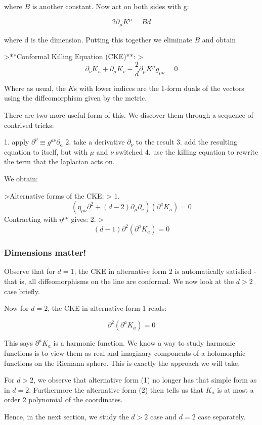 where $B$ is another constant. Now act on both sides with g:

$$2\partial_\mu K^\mu = B d$$

where d is the dimension. Putting this together we eliminate $B$ and obtain 


>**Conformal Killing Equation (CKE)**:
>$$\partial_\nu K_u + \partial_\mu K_v - \frac{2}{d}\partial_\mu K^\mu g_{\mu\nu} = 0$$

Where as usual, the $K$s with lower indices are the 1-form duals of the vectors using the diffeomorphism given by the metric.

There are two more useful form of this. We discover them through a sequence of contrived tricks:

1. apply $\partial^\nu \equiv g^{a\nu}\partial_a$ 
2. take a derivative $\partial_\nu$ to the result
3. add the resulting equation to itself, but with $\mu$ and $\nu$ switched
4. use the killing equation to rewrite the term that the laplacian acts on. 

We obtain:

>Alternative forms of the CKE:
> 1. $$(\eta_{\mu\nu}\partial^2 + (d-2)\partial_\mu\partial_\nu)(\partial^a K_a) = 0$$
Contracting with $\eta ^{\mu\nu}$ gives:
2.
> $$(d - 1) \partial^2(\partial^a K_a) = 0$$


\subsubsection{ Dimensions matter!}

Observe that for $d=1$, the CKE in alternative form 2 is automatically satisfied - that is, all diffeomorphisms on the line are conformal. We now look at the $d>2$ case briefly.

Now for $d=2$, the CKE in alternative form 1 reads:

$$\partial^2 ( \partial^a K_a) = 0$$

This says $ \partial^a K_a$ is a harmonic function. We know a way to study harmonic functions is to view them as real and imaginary components of a holomorphic functions on the Riemann sphere. This is exactly the approach we will take.


For $d > 2$, we observe that alternative form (1) no longer has that simple form as in $d=2$. Furthermore the alternative form (2) then tells us that  $K_a$ is at most a order 2 polynomial of the coordinates.

Hence, in the next section, we study the $d>2$ case and $d = 2$ case separately.


